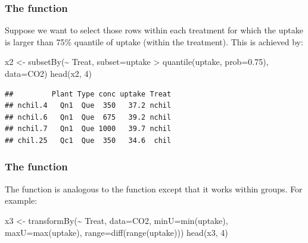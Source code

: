 \documentclass[
]{article}
\newenvironment{Shaded}{\begin{snugshade}}{\end{snugshade}}
\newcommand{\AttributeTok}[1]{\textcolor[rgb]{0.77,0.63,0.00}{#1}}
\newcommand{\DecValTok}[1]{\textcolor[rgb]{0.00,0.00,0.81}{#1}}
\newcommand{\FloatTok}[1]{\textcolor[rgb]{0.00,0.00,0.81}{#1}}
\newcommand{\FunctionTok}[1]{\textcolor[rgb]{0.00,0.00,0.00}{#1}}
\newcommand{\NormalTok}[1]{#1}
\newcommand{\OtherTok}[1]{\textcolor[rgb]{0.56,0.35,0.01}{#1}}
\newcommand{\SpecialCharTok}[1]{\textcolor[rgb]{0.00,0.00,0.00}{#1}}
\begin{document}
\hypertarget{the-function-3}{%
\subsubsection{\texorpdfstring{The 
function}{The  function}}\label{the-function-3}}

Suppose we want to select those rows within each treatment for which the
uptake is larger than 75\% quantile of uptake (within the treatment).
This is achieved by:

\begin{Shaded}
\begin{Highlighting}[]
\NormalTok{x2 }\OtherTok{\textless{}{-}} \FunctionTok{subsetBy}\NormalTok{(}\SpecialCharTok{\textasciitilde{}}\NormalTok{ Treat, }\AttributeTok{subset=}\NormalTok{uptake }\SpecialCharTok{\textgreater{}} \FunctionTok{quantile}\NormalTok{(uptake, }\AttributeTok{prob=}\FloatTok{0.75}\NormalTok{), }\AttributeTok{data=}\NormalTok{CO2)}
\FunctionTok{head}\NormalTok{(x2, }\DecValTok{4}\NormalTok{)}
\end{Highlighting}
\end{Shaded}

\begin{verbatim}
##         Plant Type conc uptake Treat
## nchil.4   Qn1  Que  350   37.2 nchil
## nchil.6   Qn1  Que  675   39.2 nchil
## nchil.7   Qn1  Que 1000   39.7 nchil
## chil.25   Qc1  Que  350   34.6  chil
\end{verbatim}

\hypertarget{the-function-4}{%
\subsubsection{\texorpdfstring{The 
function}{The  function}}\label{the-function-4}}

The  function is analogous to the 
function except that it works within groups. For example:

\begin{Shaded}
\begin{Highlighting}[]
\NormalTok{x3 }\OtherTok{\textless{}{-}} \FunctionTok{transformBy}\NormalTok{(}\SpecialCharTok{\textasciitilde{}}\NormalTok{ Treat, }\AttributeTok{data=}\NormalTok{CO2, }
                 \AttributeTok{minU=}\FunctionTok{min}\NormalTok{(uptake), }\AttributeTok{maxU=}\FunctionTok{max}\NormalTok{(uptake), }\AttributeTok{range=}\FunctionTok{diff}\NormalTok{(}\FunctionTok{range}\NormalTok{(uptake)))}
\FunctionTok{head}\NormalTok{(x3, }\DecValTok{4}\NormalTok{)}
\end{Highlighting}
\end{Shaded}
\end{document}
